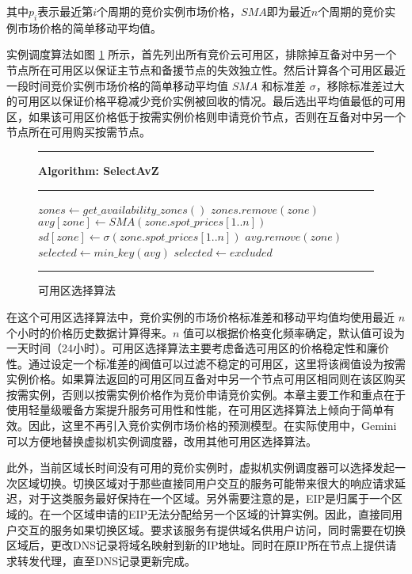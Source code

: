 其中$p_i$表示最近第$i$个周期的竞价实例市场价格，$SMA$即为最近$n$个周期的竞价实例市场价格的简单移动平均值。

实例调度算法如图 \ref{figure:avz-selection-algo} 所示，首先列出所有竞价云可用区，排除掉互备对中另一个节点所在可用区以保证主节点和备援节点的失效独立性。然后计算各个可用区最近一段时间竞价实例市场价格的简单移动平均值 $SMA$ 和标准差 $\sigma$，移除标准差过大的可用区以保证价格平稳减少竞价实例被回收的情况。最后选出平均值最低的可用区，如果该可用区价格低于按需实例价格则申请竞价节点，否则在互备对中另一个节点所在可用购买按需节点。

\begin{figure}
\rule[-.2pt]{\textwidth}{0.9pt}
\textbf{Algorithm: SelectAvZ}

\rule[-.2pt]{\textwidth}{0.5pt}

\begin{algorithmic}[1]

\State $zones\gets get\_availability\_zones()$
        \State $zones.remove(zone)$
    \EndIf
\EndFor
{}
    \State $avg[zone]\gets SMA(zone.spot\_prices[1..n])$
\EndFor
{}
    \State $sd[zone]\gets \sigma(zone.spot\_prices[1..n])$
\EndFor
{}
        \State $avg.remove(zone)$
    \EndIf
\EndFor
\State $selected\gets min\_key(avg)$
    \State $selected\gets excluded$
\EndIf
\State {}
\end{algorithmic}
\rule[-.2pt]{\textwidth}{0.8pt}
\caption{可用区选择算法}\label{figure:avz-selection-algo}
\end{figure}

在这个可用区选择算法中，竞价实例的市场价格标准差和移动平均值均使用最近 $n$ 个小时的价格历史数据计算得来。$n$ 值可以根据价格变化频率确定，默认值可设为一天时间（24小时）。可用区选择算法主要考虑备选可用区的价格稳定性和廉价性。通过设定一个标准差的阀值可以过滤不稳定的可用区，这里将该阀值设为按需实例价格。如果算法返回的可用区同互备对中另一个节点可用区相同则在该区购买按需实例，否则以按需实例价格作为竞价申请竞价实例。本章主要工作和重点在于使用轻量级暖备方案提升服务可用性和性能，在可用区选择算法上倾向于简单有效。因此，这里不再引入竞价实例市场价格的预测模型。在实际使用中，Gemini可以方便地替换虚拟机实例调度器，改用其他可用区选择算法。

此外，当前区域长时间没有可用的竞价实例时，虚拟机实例调度器可以选择发起一次区域切换。切换区域对于那些直接同用户交互的服务可能带来很大的响应请求延迟，对于这类服务最好保持在一个区域。另外需要注意的是，EIP是归属于一个区域的。在一个区域申请的EIP无法分配给另一个区域的计算实例。因此，直接同用户交互的服务如果切换区域。要求该服务有提供域名供用户访问，同时需要在切换区域后，更改DNS记录将域名映射到新的IP地址。同时在原IP所在节点上提供请求转发代理，直至DNS记录更新完成。

